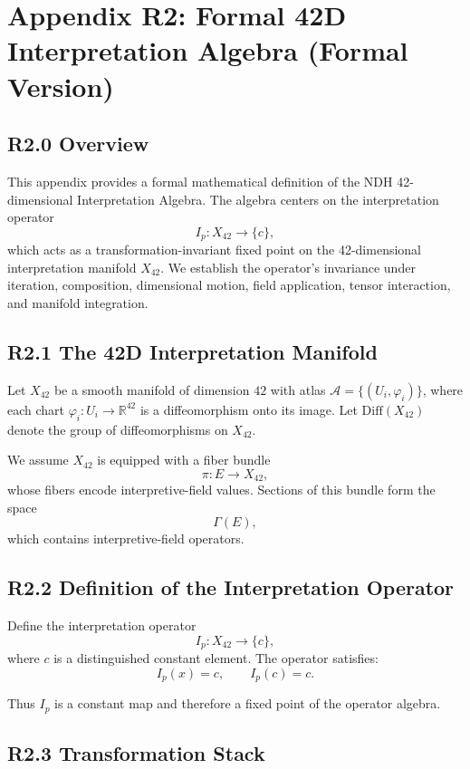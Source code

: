 \appendix
\section*{Appendix R2: Formal 42D Interpretation Algebra (Formal Version)}

\subsection*{R2.0 Overview}

This appendix provides a formal mathematical definition of the NDH
42-dimensional Interpretation Algebra. The algebra centers on the
interpretation operator
\[
I_p : X_{42} \to \{c\},
\]
which acts as a transformation-invariant fixed point on the
42-dimensional interpretation manifold $X_{42}$. We establish the
operator’s invariance under iteration, composition, dimensional motion,
field application, tensor interaction, and manifold integration.

\subsection*{R2.1 The 42D Interpretation Manifold}

Let $X_{42}$ be a smooth manifold of dimension $42$ with atlas
$\mathcal{A} = \{(U_i, \varphi_i)\}$, where each chart
$\varphi_i : U_i \to \mathbb{R}^{42}$ is a diffeomorphism onto its image.
Let $\mathrm{Diff}(X_{42})$ denote the group of diffeomorphisms on
$X_{42}$.

We assume $X_{42}$ is equipped with a fiber bundle
\[
\pi : E \to X_{42},
\]
whose fibers encode interpretive-field values. Sections of this bundle
form the space
\[
\Gamma(E),
\]
which contains interpretive-field operators.

\subsection*{R2.2 Definition of the Interpretation Operator}

Define the interpretation operator
\[
I_p : X_{42} \to \{c\},
\]
where $c$ is a distinguished constant element. The operator satisfies:
\[
I_p(x) = c,\qquad I_p(c) = c.
\]

Thus $I_p$ is a constant map and therefore a fixed point of the operator
algebra.

\subsection*{R2.3 Transformation Stack}

